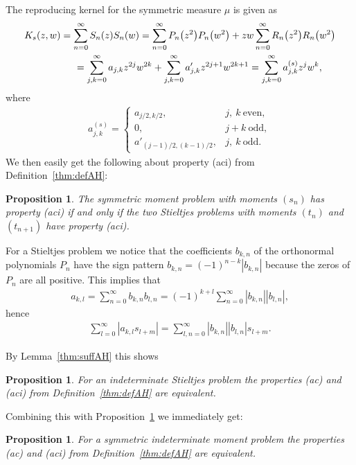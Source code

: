 \documentclass[pdftex]{sigma}
\numberwithin{equation}{section}
\newtheorem{prop}[thm]{Proposition}
\begin{document}
The reproducing kernel for the symmetric measure $\mu$ is given as
\begin{gather}
K_s(z,w) = \sum_{n=0}^\infty S_n(z)S_n(w)=\sum_{n=0}^\infty P_n\big(z^2\big)P_n\big(w^2\big)+zw\sum_{n=0}^\infty R_n\big(z^2\big)R_n\big(w^2\big)\nonumber \\
\hphantom{K_s(z,w)}{} = \sum_{j,k=0}^\infty a_{j,k}z^{2j}w^{2k}+\sum_{j,k=0}^\infty a'_{j,k}z^{2j+1}w^{2k+1} =\sum_{j,k=0}^\infty a^{(s)}_{j,k}z^{j}w^{k},\label{eq:repksym}
\end{gather}
where
\begin{gather*}
a_{j,k}^{(s)}=\begin{cases} a_{j/2,k/2}, & j, \ k \ \text{even},\\
0, & j+k \ \text{odd},\\
a'_{(j-1)/2,(k-1)/2}, & j, \ k \ \text{odd}.
\end{cases}
\end{gather*}
We then easily get the following about property (aci) from Definition~\ref{thm:defAH}:

\begin{prop}\label{thm:st-sym} The symmetric moment problem with moments $(s_n)$ has property {\rm (aci)} if and only if the two Stieltjes problems with moments
$(t_n)$ and $(t_{n+1})$ have property {\rm (aci)}.
\end{prop}

For a Stieltjes problem we notice that the coefficients $b_{k,n}$ of the orthonormal polynomials $P_n$ have the sign pattern
$b_{k,n}=(-1)^{n-k}|b_{k,n}|$ because the zeros of $P_n$ are all positive. This implies that
\begin{gather*}
a_{k,l}=\sum_{n=0}^\infty b_{k,n}b_{l,n}=(-1)^{k+l}\sum_{n=0}^\infty |b_{k,n}||b_{l,n}|,
\end{gather*}
hence
\begin{gather*}
\sum_{l=0}^\infty |a_{k,l}s_{l+m}|=\sum_{l,n=0}^\infty |b_{k,n}||b_{l,n}|s_{l+m}.
\end{gather*}

By Lemma~\ref{thm:suffAH} this shows

\begin{prop}\label{thm:stieltjesAH} For an indeterminate Stieltjes problem the properties {\rm (ac)} and {\rm (aci)} from Definition~{\rm \ref{thm:defAH}} are equivalent.
\end{prop}

Combining this with Proposition~\ref{thm:st-sym} we immediately get:

\begin{prop}\label{thm:symindetac} For a symmetric indeterminate moment problem the pro\-perties {\rm (ac)} and {\rm (aci)} from Definition~{\rm \ref{thm:defAH}} are equivalent.
\end{prop}
\end{document}
